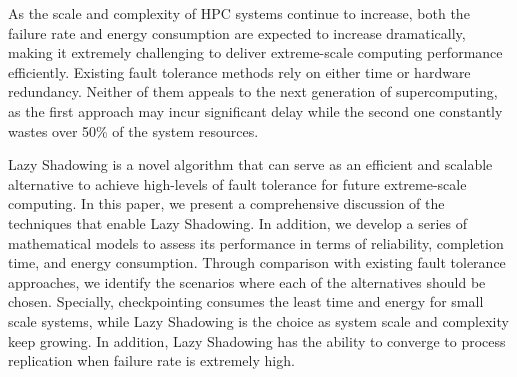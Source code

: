 As the scale and complexity of HPC systems continue to increase, both the failure rate and energy consumption are expected to increase dramatically, making it extremely challenging to deliver extreme-scale computing performance efficiently. Existing fault tolerance methods rely on either time or hardware redundancy. Neither of them appeals to the next generation of supercomputing, as the first approach may incur significant delay while the second one constantly wastes over 50\% of the system resources. %

Lazy Shadowing is a novel algorithm that can serve as an efficient and scalable alternative to achieve high-levels of fault tolerance for future extreme-scale computing. In this paper, we present a comprehensive discussion of the techniques that enable Lazy Shadowing. In addition, we develop a series of mathematical models to assess its performance in terms of reliability, completion time, and energy consumption. 
Through comparison with existing fault tolerance approaches, we identify the scenarios where each of the alternatives should be chosen. Specially, checkpointing consumes the least time and energy for small scale systems, while Lazy Shadowing is the choice as system scale and complexity keep growing. In addition, Lazy Shadowing has the ability to converge to process replication when failure rate is extremely high. 

